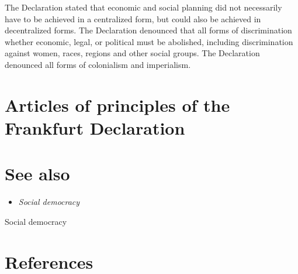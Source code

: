 The Declaration stated that economic and social planning did not
necessarily have to be achieved in a centralized form, but could also be
achieved in decentralized forms. The Declaration denounced that all
forms of discrimination whether economic, legal, or political must be
abolished, including discrimination against women, races, regions and
other social groups. The Declaration denounced all forms of colonialism
and imperialism.

\section{Articles of principles of the Frankfurt
Declaration}\label{articles-of-principles-of-the-frankfurt-declaration}

\section{See also}\label{see-also}

\begin{itemize}
\item
  \emph{Social democracy}
\end{itemize}

Social democracy

\section{References}\label{references}
